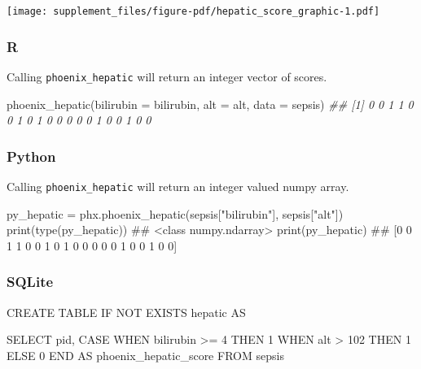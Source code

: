 \documentclass[
  letterpaper,
  DIV=11,
  numbers=noendperiod]{scrartcl}
\newenvironment{Shaded}{\begin{snugshade}}{\end{snugshade}}
\newcommand{\AttributeTok}[1]{\textcolor[rgb]{0.40,0.45,0.13}{#1}}
\newcommand{\BuiltInTok}[1]{\textcolor[rgb]{0.00,0.23,0.31}{#1}}
\newcommand{\CommentTok}[1]{\textcolor[rgb]{0.37,0.37,0.37}{#1}}
\newcommand{\ControlFlowTok}[1]{\textcolor[rgb]{0.00,0.23,0.31}{#1}}
\newcommand{\DecValTok}[1]{\textcolor[rgb]{0.68,0.00,0.00}{#1}}
\newcommand{\DocumentationTok}[1]{\textcolor[rgb]{0.37,0.37,0.37}{\textit{#1}}}
\newcommand{\FunctionTok}[1]{\textcolor[rgb]{0.28,0.35,0.67}{#1}}
\newcommand{\KeywordTok}[1]{\textcolor[rgb]{0.00,0.23,0.31}{#1}}
\newcommand{\NormalTok}[1]{\textcolor[rgb]{0.00,0.23,0.31}{#1}}
\newcommand{\OperatorTok}[1]{\textcolor[rgb]{0.37,0.37,0.37}{#1}}
\newcommand{\StringTok}[1]{\textcolor[rgb]{0.13,0.47,0.30}{#1}}
\begin{document}
\texttt{[image: supplement\_files/figure-pdf/hepatic\_score\_graphic-1.pdf]}

\subsubsection{R}\label{r-9}

Calling \texttt{phoenix\_hepatic} will return an integer vector of
scores.

\begin{Shaded}
\begin{Highlighting}[]
\FunctionTok{phoenix\_hepatic}\NormalTok{(}\AttributeTok{bilirubin =}\NormalTok{ bilirubin, }\AttributeTok{alt =}\NormalTok{ alt, }\AttributeTok{data =}\NormalTok{ sepsis)}
\DocumentationTok{\#\#  [1] 0 0 1 1 0 0 1 0 1 0 0 0 0 0 1 0 0 1 0 0}
\end{Highlighting}
\end{Shaded}

\subsubsection{Python}\label{python-9}

Calling \texttt{phoenix\_hepatic} will return an integer valued numpy
array.

\begin{Shaded}
\begin{Highlighting}[]
\NormalTok{py\_hepatic }\OperatorTok{=}\NormalTok{ phx.phoenix\_hepatic(sepsis[}\StringTok{"bilirubin"}\NormalTok{], sepsis[}\StringTok{"alt"}\NormalTok{])}
\BuiltInTok{print}\NormalTok{(}\BuiltInTok{type}\NormalTok{(py\_hepatic))}
\CommentTok{\#\# \textless{}class \textquotesingle{}numpy.ndarray\textquotesingle{}\textgreater{}}
\BuiltInTok{print}\NormalTok{(py\_hepatic)}
\CommentTok{\#\# [0 0 1 1 0 0 1 0 1 0 0 0 0 0 1 0 0 1 0 0]}
\end{Highlighting}
\end{Shaded}

\subsubsection{SQLite}\label{sqlite-7}

\begin{Shaded}
\begin{Highlighting}[]
\KeywordTok{CREATE} \KeywordTok{TABLE} \ControlFlowTok{IF} \KeywordTok{NOT} \KeywordTok{EXISTS}\NormalTok{ hepatic }\KeywordTok{AS}

  \KeywordTok{SELECT}
\NormalTok{    pid,}
    \ControlFlowTok{CASE} \ControlFlowTok{WHEN}\NormalTok{ bilirubin }\OperatorTok{\textgreater{}=} \DecValTok{4} \ControlFlowTok{THEN} \DecValTok{1}
         \ControlFlowTok{WHEN}\NormalTok{ alt }\OperatorTok{\textgreater{}} \DecValTok{102} \ControlFlowTok{THEN} \DecValTok{1}
         \ControlFlowTok{ELSE} \DecValTok{0} \ControlFlowTok{END} \KeywordTok{AS}\NormalTok{ phoenix\_hepatic\_score}
  \KeywordTok{FROM}\NormalTok{ sepsis}
\end{Highlighting}
\end{Shaded}
\end{document}
